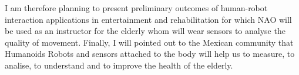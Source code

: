 \documentclass[12pt,journal,onecolumn,compsoc]{IEEEtran}
\begin{document}
I am therefore planning to present preliminary outcomes 
of human-robot interaction applications in entertainment and rehabilitation for which 
NAO will be used as an instructor for the elderly whom will wear sensors 
to analyse the quality of movement. 
Finally, I will pointed out to the Mexican community that 
Humanoids Robots and sensors attached to the body 
will help us to measure, to analise, to understand and to improve the health of the elderly.











\end{document}
